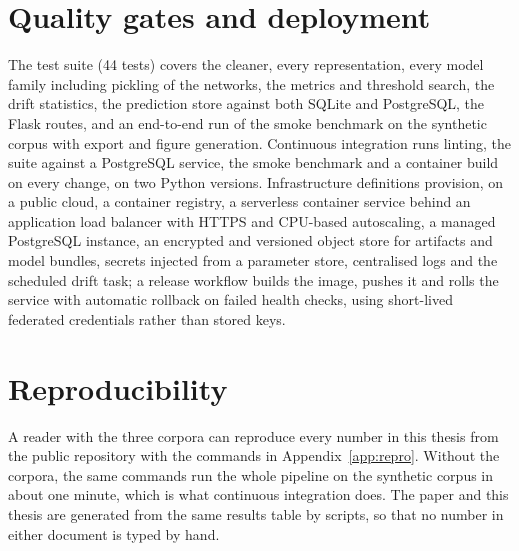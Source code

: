 \section{Quality gates and deployment}
The test suite (44 tests) covers the cleaner, every representation, every model family including pickling of the networks, the metrics and threshold search, the drift statistics, the prediction store against both SQLite and PostgreSQL, the Flask routes, and an end-to-end run of the smoke benchmark on the synthetic corpus with export and figure generation. Continuous integration runs linting, the suite against a PostgreSQL service, the smoke benchmark and a container build on every change, on two Python versions. Infrastructure definitions provision, on a public cloud, a container registry, a serverless container service behind an application load balancer with HTTPS and CPU-based autoscaling, a managed PostgreSQL instance, an encrypted and versioned object store for artifacts and model bundles, secrets injected from a parameter store, centralised logs and the scheduled drift task; a release workflow builds the image, pushes it and rolls the service with automatic rollback on failed health checks, using short-lived federated credentials rather than stored keys.

\section{Reproducibility}
A reader with the three corpora can reproduce every number in this thesis from the public repository with the commands in Appendix~\ref{app:repro}. Without the corpora, the same commands run the whole pipeline on the synthetic corpus in about one minute, which is what continuous integration does. The paper and this thesis are generated from the same results table by scripts, so that no number in either document is typed by hand.
